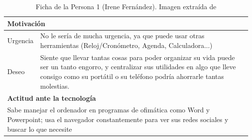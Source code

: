 \begin{table}[H]
\begin{tabular}{|l|l|l|}
		\hline
		\multicolumn{3}{|l|}{{\cellcolor{lightblue}}\textbf{Motivación}}                   \\ 
		\hline
		Urgencia     & \multicolumn{2}{l|}{
			\begin{minipage}[t]{0.7\textwidth}
				No le sería de mucha urgencia, ya que puede usar otras herramientas (Reloj/Cronómetro, Agenda, Calculadora...)
			\end{minipage}
		}                \\ 
		\hline
		Deseo        & \multicolumn{2}{l|}{
			\begin{minipage}[t]{0.7\textwidth}
				Siente que llevar tantas cosas para poder organizar su vida puede ser un tanto engorro, y centralizar sus utilidades en algo que lleve consigo como su portátil o su teléfono podría ahorrarle tantas molestias.
			\end{minipage}
		}                \\ 
		\hline
		\multicolumn{3}{|l|}{{\cellcolor{lightblue}}\textbf{Actitud ante la tecnología}}    \\ 
		\hline
		\multicolumn{3}{|l|}{
			\begin{minipage}[t]{\textwidth}
				Sabe manejar el ordenador en programas de ofimática como Word y Powerpoint; usa el navegador constantemente para ver sus redes sociales y buscar lo que necesite
			\end{minipage}
		}                              \\
		\hline
	\end{tabular}
	\caption[Ficha Persona 1]{Ficha de la Persona 1 (Irene Fernández). Imagen extraída de \cite{thispersondoesnotexist}}
\end{table}

\newpage

